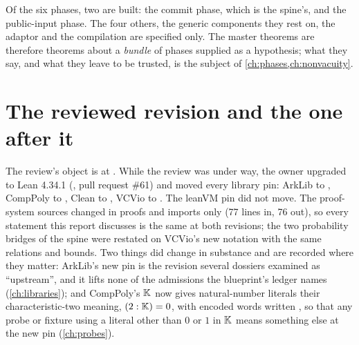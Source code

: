 Of the six phases, two are built: the commit phase, which is the spine's, and the public-input
phase. The four others, the generic components they rest on, the adaptor and the compilation
are specified only. The master theorems are therefore theorems about a \emph{bundle} of phases
supplied as a hypothesis; what they say, and what they leave to be trusted, is the subject of
\cref{ch:phases,ch:nonvacuity}.

\section{The reviewed revision and the one after it}\label{sec:map-revision}

The review's object is  at . While the review was under way, the
owner upgraded  to Lean 4.34.1 (, pull request \#61) and moved every
library pin: ArkLib to , CompPoly to , Clean to ,
VCVio to . The leanVM pin did not move. The proof-system sources changed in
proofs and imports only (77 lines in, 76 out), so every statement this report discusses is the
same at both revisions; the two probability bridges of the spine were restated on VCVio's new
notation with the same relations and bounds. Two things did change in substance and are
recorded where they matter: ArkLib's new pin is the revision several dossiers examined as
\enquote{upstream}, and it lifts none of the admissions the blueprint's ledger names
(\cref{ch:libraries}); and CompPoly's $\mathbb{K}$ now gives natural-number literals their
characteristic-two meaning, $(2 : \mathbb{K}) = 0$, with encoded words written , so
that any probe or fixture using a literal other than $0$ or $1$ in $\mathbb{K}$ means something else at
the new pin (\cref{ch:probes}).
